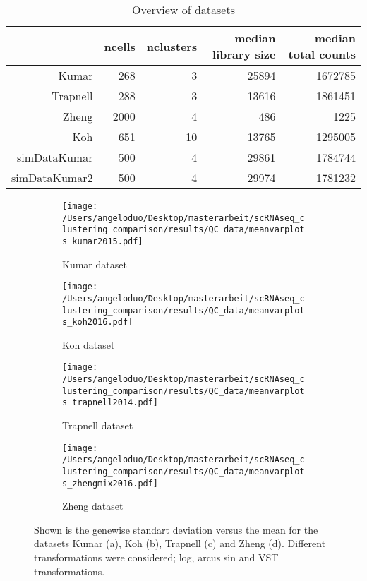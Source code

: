 \documentclass[12pt, a4paper]{article}\usepackage[]{graphicx}\usepackage[]{color}
\begin{document}
\begin{table}[ht]
\centering
\begin{tabular}{rrrrr}
  \hline
 & ncells & nclusters & median library size & median total counts \\ 
  \hline
Kumar & 268 & 3 & 25894 & 1672785 \\ 
  Trapnell & 288 & 3 & 13616 & 1861451 \\ 
  Zheng & 2000 & 4 & 486 & 1225 \\ 
  Koh & 651 & 10 & 13765 & 1295005 \\ 
  simDataKumar & 500 & 4 & 29861 & 1784744 \\ 
  simDataKumar2 & 500 & 4 & 29974 & 1781232 \\ 
   \hline
\end{tabular}
\caption{Overview of datasets} 
\end{table}

\begin{figure}
\centering
\begin{subfigure}{.5\textwidth}
  \centering
  \texttt{[image: /Users/angeloduo/Desktop/masterarbeit/scRNAseq\_clustering\_comparison/results/QC\_data/meanvarplots\_kumar2015.pdf]}
  \caption{Kumar dataset}
  \label{fig:transsim}
\end{subfigure}%
\begin{subfigure}{.5\textwidth}
  \centering
  \texttt{[image: /Users/angeloduo/Desktop/masterarbeit/scRNAseq\_clustering\_comparison/results/QC\_data/meanvarplots\_koh2016.pdf]}
  \caption{Koh dataset}
  \label{fig:transkoh}
\end{subfigure}
\begin{subfigure}{.5\textwidth}
  \centering
  \texttt{[image: /Users/angeloduo/Desktop/masterarbeit/scRNAseq\_clustering\_comparison/results/QC\_data/meanvarplots\_trapnell2014.pdf]}
  \caption{Trapnell dataset}
  \label{fig:transtrapnell}
\end{subfigure}%
\begin{subfigure}{.5\textwidth}
  \centering
  \texttt{[image: /Users/angeloduo/Desktop/masterarbeit/scRNAseq\_clustering\_comparison/results/QC\_data/meanvarplots\_zhengmix2016.pdf]}
  \caption{Zheng dataset}
  \label{fig:transzheng}
\end{subfigure}
\caption{Shown is the genewise standart deviation versus the mean for the datasets Kumar (a), Koh (b), Trapnell (c) and Zheng (d). Different transformations were considered; log, arcus sin and VST transformations. }
\label{fig:trans}
\end{figure}
\end{document}
